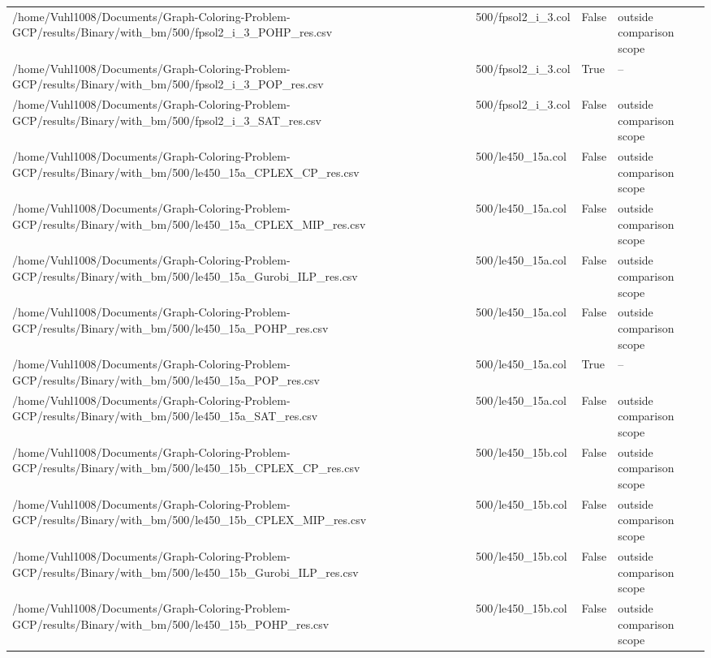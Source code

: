 \begin{table}[htbp]
\begin{tabular}{llll}
/home/Vuhl1008/Documents/Graph-Coloring-Problem-GCP/results/Binary/with\_bm/500/fpsol2\_i\_3\_POHP\_res.csv & 500/fpsol2\_i\_3.col & False & outside comparison scope \\
/home/Vuhl1008/Documents/Graph-Coloring-Problem-GCP/results/Binary/with\_bm/500/fpsol2\_i\_3\_POP\_res.csv & 500/fpsol2\_i\_3.col & True & -- \\
/home/Vuhl1008/Documents/Graph-Coloring-Problem-GCP/results/Binary/with\_bm/500/fpsol2\_i\_3\_SAT\_res.csv & 500/fpsol2\_i\_3.col & False & outside comparison scope \\
/home/Vuhl1008/Documents/Graph-Coloring-Problem-GCP/results/Binary/with\_bm/500/le450\_15a\_CPLEX\_CP\_res.csv & 500/le450\_15a.col & False & outside comparison scope \\
/home/Vuhl1008/Documents/Graph-Coloring-Problem-GCP/results/Binary/with\_bm/500/le450\_15a\_CPLEX\_MIP\_res.csv & 500/le450\_15a.col & False & outside comparison scope \\
/home/Vuhl1008/Documents/Graph-Coloring-Problem-GCP/results/Binary/with\_bm/500/le450\_15a\_Gurobi\_ILP\_res.csv & 500/le450\_15a.col & False & outside comparison scope \\
/home/Vuhl1008/Documents/Graph-Coloring-Problem-GCP/results/Binary/with\_bm/500/le450\_15a\_POHP\_res.csv & 500/le450\_15a.col & False & outside comparison scope \\
/home/Vuhl1008/Documents/Graph-Coloring-Problem-GCP/results/Binary/with\_bm/500/le450\_15a\_POP\_res.csv & 500/le450\_15a.col & True & -- \\
/home/Vuhl1008/Documents/Graph-Coloring-Problem-GCP/results/Binary/with\_bm/500/le450\_15a\_SAT\_res.csv & 500/le450\_15a.col & False & outside comparison scope \\
/home/Vuhl1008/Documents/Graph-Coloring-Problem-GCP/results/Binary/with\_bm/500/le450\_15b\_CPLEX\_CP\_res.csv & 500/le450\_15b.col & False & outside comparison scope \\
/home/Vuhl1008/Documents/Graph-Coloring-Problem-GCP/results/Binary/with\_bm/500/le450\_15b\_CPLEX\_MIP\_res.csv & 500/le450\_15b.col & False & outside comparison scope \\
/home/Vuhl1008/Documents/Graph-Coloring-Problem-GCP/results/Binary/with\_bm/500/le450\_15b\_Gurobi\_ILP\_res.csv & 500/le450\_15b.col & False & outside comparison scope \\
/home/Vuhl1008/Documents/Graph-Coloring-Problem-GCP/results/Binary/with\_bm/500/le450\_15b\_POHP\_res.csv & 500/le450\_15b.col & False & outside comparison scope \\

\end{tabular}
\end{table}
